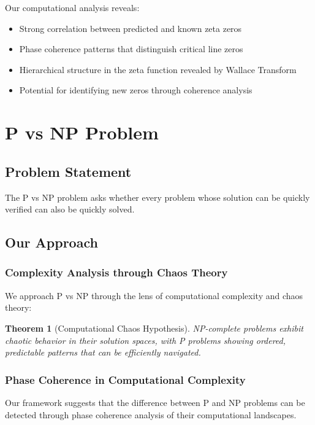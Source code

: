 \documentclass[12pt]{article}
\newtheorem{theorem}{Theorem}
\begin{document}
Our computational analysis reveals:
\begin{itemize}
    \item Strong correlation between predicted and known zeta zeros
    \item Phase coherence patterns that distinguish critical line zeros
    \item Hierarchical structure in the zeta function revealed by Wallace Transform
    \item Potential for identifying new zeros through coherence analysis
\end{itemize}

\section{P vs NP Problem}

\subsection{Problem Statement}
The P vs NP problem asks whether every problem whose solution can be quickly verified can also be quickly solved.

\subsection{Our Approach}

\subsubsection{Complexity Analysis through Chaos Theory}

We approach P vs NP through the lens of computational complexity and chaos theory:

\begin{theorem}[Computational Chaos Hypothesis]
NP-complete problems exhibit chaotic behavior in their solution spaces, with P problems showing ordered, predictable patterns that can be efficiently navigated.
\end{theorem}

\subsubsection{Phase Coherence in Computational Complexity}

Our framework suggests that the difference between P and NP problems can be detected through phase coherence analysis of their computational landscapes.
\end{document}
